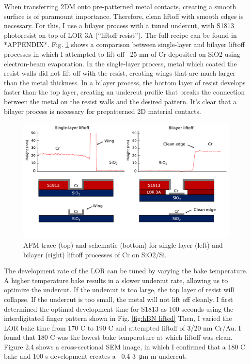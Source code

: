\documentclass[double,12pt,1in]{beavtex}
\begin{document}
When transferring 2DM onto pre-patterned metal contacts, creating a smooth surface is of paramount importance. Therefore, clean liftoff with smooth edges is necessary. For this, I use a bilayer process with a tuned undercut, with S1813 photoresist on top of LOR 3A (“liftoff resist”). The full recipe can be found in *APPENDIX*. Fig. \ref{fig:Liftoff AFM} shows a comparison between single-layer and bilayer liftoff processes in which I attempted to lift off ~25 nm of Cr deposited on SiO2 using electron-beam evaporation. In the single-layer process, metal which coated the resist walls did not lift off with the resist, creating wings that are much larger than the metal thickness. In a bilayer process, the bottom layer of resist develops faster than the top layer, creating an undercut profile that breaks the connection between the metal on the resist walls and the desired pattern. It’s clear that a bilayer process is necessary for prepatterned 2D material contacts. 

\begin{figure}
    \includegraphics[width = 1\textwidth]{Liftoff AFM.png}
    \caption{AFM trace (top) and schematic (bottom) for single-layer (left) and bilayer (right) liftoff processes of Cr on SiO2/Si.}
    \label{fig:Liftoff AFM}
\end{figure}

The development rate of the LOR can be tuned by varying the bake temperature. A higher temperature bake results in a slower undercut rate, allowing us to optimize the undercut. If the undercut is too large, the top layer of resist will collapse. If the undercut is too small, the metal will not lift off cleanly. I first determined the optimal development time for S1813 as 100 seconds using the interdigitated finger pattern shown in Fig. \ref{fig:hBN lifted} Then, I varied the LOR bake time from 170 C to 190 C and attempted liftoff of 3/20 nm Cr/Au. I found that 180 C was the lowest bake temperature at which liftoff was clean. Figure 2.4 shows a cross-sectional SEM image, in which I confirmed that a 180 C bake and 100 s development creates a ~0.4 \SI{3}{\micro\meter} m undercut.
\end{document}
